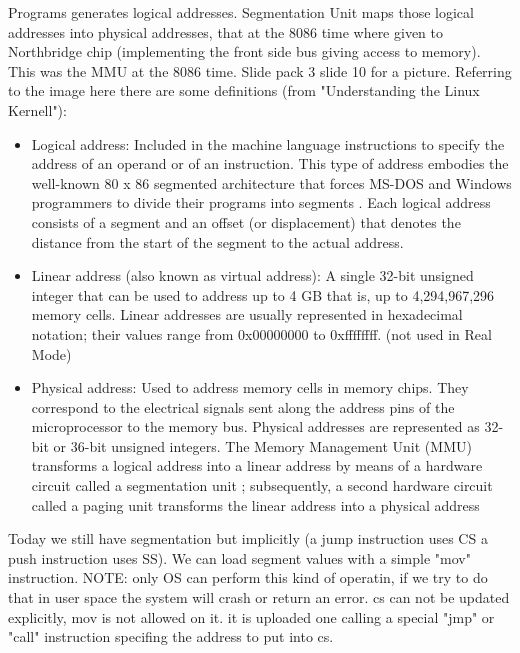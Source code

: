 \documentclass[a4paper,12pt]{article}
\begin{document}
Programs generates logical addresses. Segmentation Unit maps those logical addresses into physical addresses, that at the 8086 time where given to Northbridge chip (implementing the front side bus giving access to memory). This was the MMU at the 8086 time. Slide pack 3 slide 10 for a picture. Referring to the image here there are some definitions (from "Understanding the Linux Kernell"): \begin{itemize}
\item Logical address:
Included in the machine language instructions to specify the address of an operand or of an instruction. This type of address embodies the well-known 80 x 86 segmented architecture that forces MS-DOS and Windows programmers to divide their programs into segments . Each logical address consists of a segment and an offset (or displacement) that denotes the distance from the start of the segment to the actual address.

\item Linear address (also known as virtual address):
A single 32-bit unsigned integer that can be used to address up to 4 GB that is, up to 4,294,967,296 memory cells. Linear addresses are usually represented in hexadecimal notation; their values range from 0x00000000 to 0xffffffff. (not used in Real Mode)

\item Physical address:
Used to address memory cells in memory chips. They correspond to the electrical signals sent along the address pins of the microprocessor to the memory bus. Physical addresses are represented as 32-bit or 36-bit unsigned integers. The Memory Management Unit (MMU) transforms a logical address into a linear address by means of a hardware circuit called a segmentation unit ; subsequently, a second hardware circuit called a paging unit transforms the linear address into a physical address
\end{itemize}

Today we still have segmentation but implicitly (a jump instruction uses CS a push instruction uses SS). We can load segment values with a simple  "mov" instruction. NOTE: only OS can perform this kind of operatin, if we try to do that in user space the system will crash or return an error. cs can not be updated explicitly, mov is not allowed on it. it is uploaded one calling a special "jmp" or "call" instruction specifing the address to put into cs.
\end{document}
